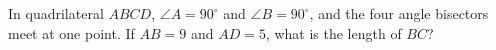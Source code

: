 In quadrilateral $ABCD$, $\angle A=90^\circ$ and $\angle B=90^\circ$, and the four angle bisectors meet at one point. If $AB=9$ and $AD=5$, what is the length of $BC$?
